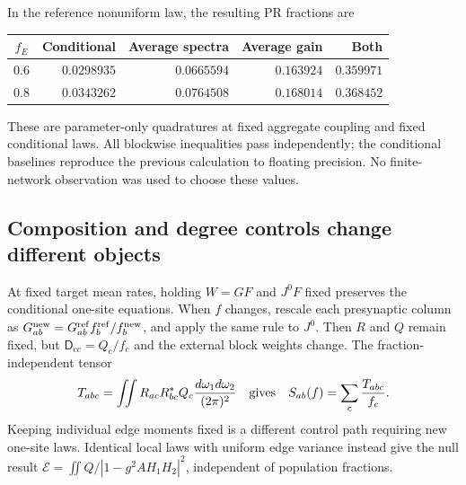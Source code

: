 In the reference nonuniform law, the resulting PR fractions are
\begin{center}
\begin{tabular}{c|rrrr}
$f_E$ & Conditional & Average spectra & Average gain & Both\\\hline
$0.6$ & $0.0298935$ & $0.0665594$ & $0.163924$ & $0.359971$\\
$0.8$ & $0.0343262$ & $0.0764508$ & $0.168014$ & $0.368452$
\end{tabular}
\end{center}
These are parameter-only quadratures at fixed aggregate coupling and fixed
conditional laws. All blockwise inequalities pass independently; the
conditional baselines reproduce the previous calculation to floating
precision. No finite-network observation was used to choose these values.

\subsection{Composition and degree controls change different objects}

At fixed target mean rates, holding $W=GF$ and $J^0F$ fixed preserves the
conditional one-site equations. When $f$ changes, rescale each presynaptic
column as $G_{ab}^{\rm new}=G_{ab}^{\rm ref}f_b^{\rm ref}/f_b^{\rm new}$,
and apply the same rule to $J^0$. Then $R$ and $Q$ remain fixed, but
$\mathsf D_{cc}=Q_c/f_c$ and the external block weights change. The
fraction-independent tensor
\begin{equation}
 T_{abc}=\iint R_{ac}R_{bc}^*Q_c
                  \frac{d\omega_1d\omega_2}{(2\pi)^2}
 \quad\hbox{gives}\quad S_{ab}(f)=\sum_c\frac{T_{abc}}{f_c}.
 \label{eq:an_composition}
\end{equation}
Keeping individual edge moments fixed is a different control path requiring
new one-site laws. Identical local laws with uniform edge variance instead
give the null result $\mathcal E=\iint Q/|1-g^2AH_1H_2|^2$, independent of
population fractions.

